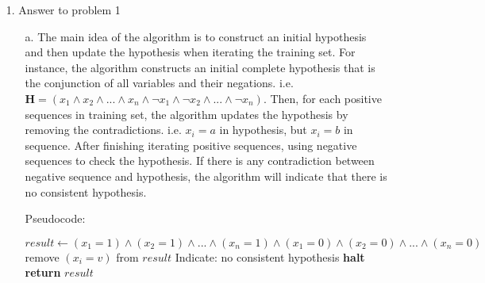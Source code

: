 
\usepackage{amsmath}
\usepackage{algorithm}%
\usepackage{algpseudocode}%

\DeclareMathOperator{\proj}{proj}
\newcommand{\vctproj}[2][]{\proj_{\vec{#1}}\vec{#2}}

\oddsidemargin 0in
\evensidemargin 0in
\textwidth 6.5in
\topmargin -0.5in
\textheight 9.0in




\pagestyle{myheadings}  %

\begin{enumerate}
\item[1.] Answer to problem 1
	\begin{enumerate}
	\item[a.] The main idea of the algorithm is to construct an initial hypothesis and then update the hypothesis when iterating the training set. For instance, the algorithm constructs an initial complete hypothesis that is the conjunction of all variables and their negations. i.e. ${\mathbf H} = (x_1 \land x_2 \land ... \land x_n \land \neg x_1 \land \neg x_2 \land ... \land \neg x_n)$. Then, for each positive sequences in training set, the algorithm updates the hypothesis by removing the contradictions. i.e. $x_i = a$ in hypothesis, but $x_i = b$ in sequence. After finishing iterating positive sequences, using negative sequences to check the hypothesis. If there is any contradiction between negative sequence and hypothesis, the algorithm will indicate that there is no consistent hypothesis.
		\begin{algorithm}
		\caption{Pseudocode:}\label{euclid}
		\begin{algorithmic}[1]
		\State $\textit{result} \gets \textit{$(x_1 = 1) \land (x_2 = 1) \land ... \land (x_n = 1) \land (x_1 = 0) \land (x_2 = 0) \land ... \land (x_n = 0)$}$
		\State remove $(x_i = v)$ from $\textit{result}$
		\EndIf
      	\EndFor
		\State Indicate: no consistent hypothesis
		\State \textbf{halt}
		\EndIf
      	\EndFor
      	\State \textbf{return} $\textit{result}$
		\EndProcedure

\end{algorithmic}
\end{algorithm}
\end{enumerate}
\end{enumerate}
